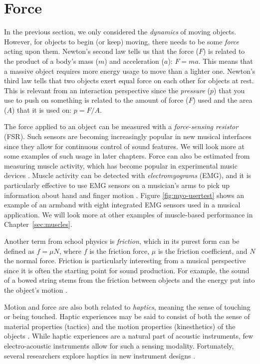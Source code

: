 \section{Force}

In the previous section, we only considered the \emph{dynamics} of moving objects. However, for objects to begin (or keep) moving, there needs to be some \emph{force} acting upon them. Newton's second law tells us that the force ($F$) is related to the product of a body's mass ($m$) and acceleration ($a$): $F=ma$. This means that a massive object requires more energy usage to move than a lighter one. Newton's third law tells that two objects exert equal force on each other for objects at rest. This is relevant from an interaction perspective since the \emph{pressure} ($p$) that you use to push on something is related to the amount of force ($F$) used and the area ($A$) that it is used on: $p=F/A$.

The force applied to an object can be measured with a \emph{force-sensing resistor} (FSR). Such sensors are becoming increasingly popular in new musical interfaces since they allow for continuous control of sound features. We will look more at some examples of such usage in later chapters. Force can also be estimated from measuring muscle activity, which has become popular in experimental music devices \citep{tanaka_musical_1993,perez_biotools_2008}. Muscle activity can be detected with \emph{electromyograms} (EMG), and it is particularly effective to use EMG sensors on a musician's arms to pick up information about hand and finger motion \citep{nymoen_mumyo_2015,erdem_exploring_2020}. Figure \ref{fig:myo-usertest} shows an example of an armband with eight integrated EMG sensors used in a musical application. We will look more at other examples of muscle-based performance in Chapter~\ref{sec:muscles}.

Another term from school physics is \emph{friction}, which in its purest form can be defined as $f=\mu N$, where $f$ is the friction force, $\mu$ is the friction coefficient, and $N$ the normal force. Friction is particularly interesting from a musical perspective since it is often the starting point for sound production. For example, the sound of a bowed string stems from the friction between objects and the energy put into the object's motion \citep{guettler_bowed_2002,serafin_sound_2004,schoonderwaldt_mechanics_2009}.

Motion and force are also both related to \emph{haptics}, meaning the sense of touching or being touched. Haptic experiences may be said to consist of both the sense of material properties (tactics) and the motion properties (kinesthetics) of the objects \citep{cook_music_1999}. While haptic experiences are a natural part of acoustic instruments, few electro-acoustic instruments allow for such a sensing modality. Fortunately, several researchers explore haptics in new instrument designs \citep{papetti_musical_2018}.


